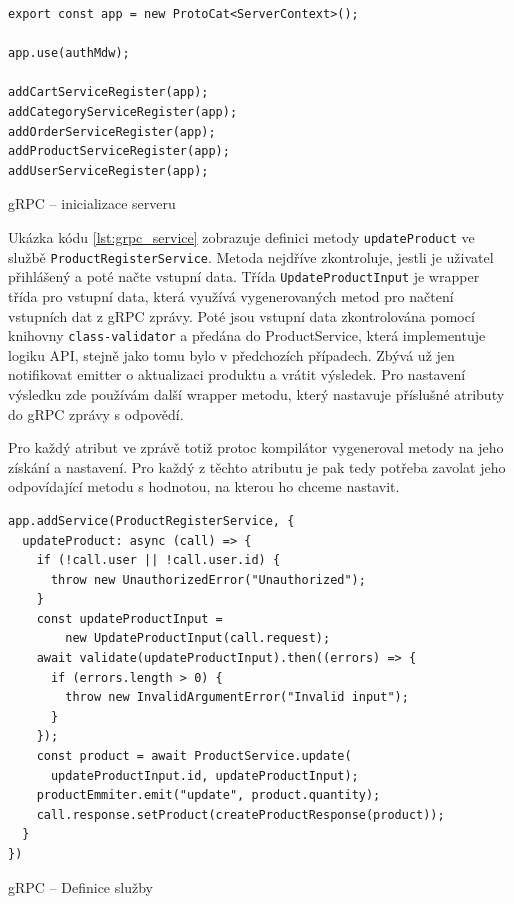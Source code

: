 \documentclass[thesis=M,czech]{FITthesis}[2019/12/23]
\begin{document}
\begin{listing}
\begin{verbatim}
export const app = new ProtoCat<ServerContext>();

app.use(authMdw);

addCartServiceRegister(app);
addCategoryServiceRegister(app);
addOrderServiceRegister(app);
addProductServiceRegister(app);
addUserServiceRegister(app);
\end{verbatim}
\caption{gRPC -- inicializace serveru}
\label{lst:grpc_init}
\end{listing}


Ukázka kódu \ref{lst:grpc_service} zobrazuje definici metody \texttt{updateProduct} ve službě \texttt{ProductRegisterService}. Metoda nejdříve zkontroluje, jestli je uživatel přihlášený a poté načte vstupní data. Třída \texttt{UpdateProductInput} je wrapper třída pro vstupní data, která využívá vygenerovaných metod pro načtení vstupních dat z gRPC zprávy. Poté jsou vstupní data zkontrolována pomocí knihovny \texttt{class-validator} a předána do ProductService, která implementuje logiku API, stejně jako tomu bylo v předchozích případech. Zbývá už jen notifikovat emitter o aktualizaci produktu a vrátit výsledek. Pro nastavení výsledku zde používám další wrapper metodu, který nastavuje příslušné atributy do gRPC zprávy s odpovědí.

Pro každý atribut ve zprávě totiž protoc kompilátor vygeneroval metody na jeho získání a nastavení. Pro každý z těchto atributu je pak tedy potřeba zavolat jeho odpovídající metodu s hodnotou, na kterou ho chceme nastavit.

\begin{listing}
\begin{verbatim}
app.addService(ProductRegisterService, {
  updateProduct: async (call) => {
    if (!call.user || !call.user.id) {
      throw new UnauthorizedError("Unauthorized");
    }
    const updateProductInput = 
        new UpdateProductInput(call.request);
    await validate(updateProductInput).then((errors) => {
      if (errors.length > 0) {
        throw new InvalidArgumentError("Invalid input");
      }
    });
    const product = await ProductService.update(
      updateProductInput.id, updateProductInput);
    productEmmiter.emit("update", product.quantity);
    call.response.setProduct(createProductResponse(product));
  }
})
\end{verbatim}
\caption{gRPC -- Definice služby}
\label{lst:grpc_service}
\end{listing}
\end{document}
